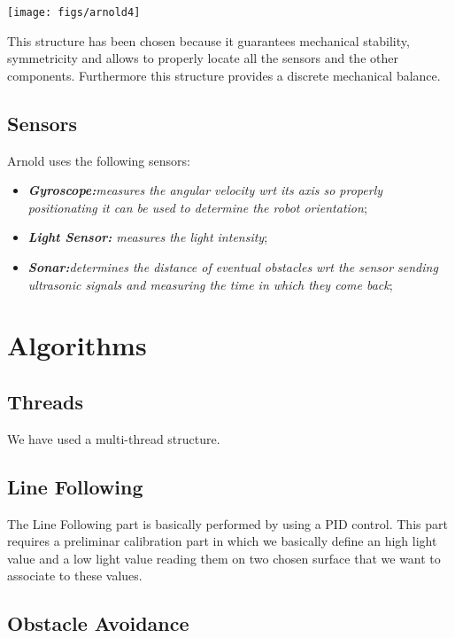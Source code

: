 \documentclass[a4paper,11pt,oneside]{book}
\begin{document}
\begin{center}
	\texttt{[image: figs/arnold4]}
\end{center}


This structure has been chosen because it guarantees mechanical stability, symmetricity and allows to properly locate all the sensors and the other components. Furthermore this structure provides a discrete mechanical balance.\\


\subsection {Sensors}

Arnold uses the following sensors:
\begin{itemize}
	\item \textit{ \textbf {Gyroscope:}measures the angular velocity wrt its axis so properly positionating it can be used to determine the robot orientation};
	\item \textit{\textbf {Light Sensor:} measures the light intensity};
	\item \textit{\textbf {Sonar:}determines the distance of eventual obstacles wrt the sensor sending ultrasonic signals and measuring the time in which they come back};
	
\end{itemize}

\section{Algorithms}
\subsection {Threads}

We have used a multi-thread structure.

\subsection {Line Following}

The Line Following part is basically performed by using a PID control. This part requires a preliminar calibration part in which we basically define an high light value and a low light value reading them on two chosen surface that we want to associate to these values.

\subsection {Obstacle Avoidance}
\end{document}
